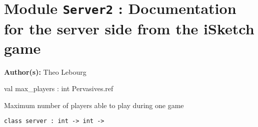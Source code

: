 \documentclass[11pt]{article}
\begin{document}
\tableofcontents
\section{Module {\tt{Server2}} : Documentation for the server side from the iSketch game}
\label{module:Server2}


{\bf Author(s): }Theo Lebourg



\ocamldocvspace{0.5cm}



\label{val:Server2.max-underscoreplayers}\begin{ocamldoccode}
val max_players : int Pervasives.ref
\end{ocamldoccode}
\begin{ocamldocdescription}
Maximum number of players able to play during one game


\end{ocamldocdescription}




\begin{ocamldoccode}
{\tt{class server : }}{\tt{int -> int -> }}\end{ocamldoccode}
\label{class:Server2.server}
\end{document}
